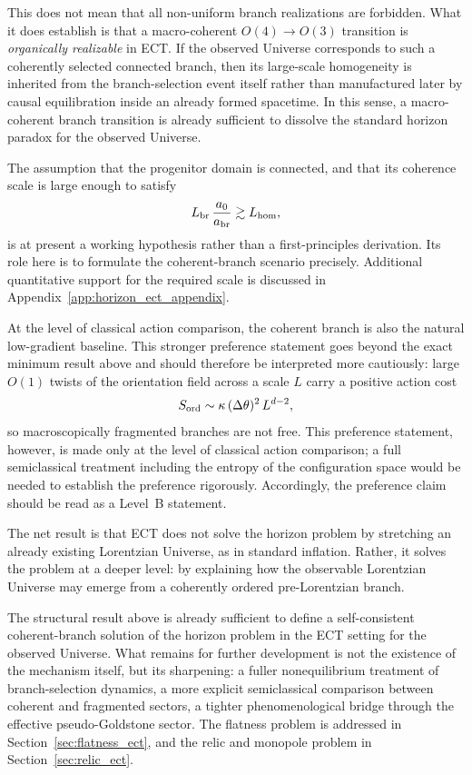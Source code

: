\documentclass[11pt,a4paper]{article}
\numberwithin{equation}{section}
\begin{document}
This does not mean that all non-uniform branch realizations are
forbidden.
What it does establish is that a macro-coherent
$O(4)\to O(3)$ transition is \emph{organically realizable} in ECT.
If the observed Universe corresponds to such a coherently selected
connected branch, then its large-scale homogeneity is inherited from the
branch-selection event itself rather than manufactured later by causal
equilibration inside an already formed spacetime.
In this sense, a macro-coherent branch transition is already sufficient
to dissolve the standard horizon paradox for the observed Universe.

The assumption that the progenitor domain is connected, and that its
coherence scale is large enough to satisfy
\[
L_{\rm br}\,\frac{a_0}{a_{\rm br}}\gtrsim L_{\rm hom},
\]
is at present a working hypothesis rather than a first-principles
derivation.
Its role here is to formulate the coherent-branch scenario precisely.
Additional quantitative support for the required scale is discussed in
Appendix~\ref{app:horizon_ect_appendix}.

At the level of classical action comparison, the coherent branch is also
the natural low-gradient baseline.
This stronger preference statement goes beyond the exact minimum result
above and should therefore be interpreted more cautiously:
large $O(1)$ twists of the orientation field across a scale $L$ carry a
positive action cost
\[
S_{\rm ord}\sim \kappa\,(\Delta\theta)^2\,L^{d-2},
\]
so macroscopically fragmented branches are not free.
This preference statement, however, is made only at the level of
classical action comparison; a full semiclassical treatment including
the entropy of the configuration space would be needed to establish the
preference rigorously.
Accordingly, the preference claim should be read as a Level~B statement.

The net result is that ECT does not solve the horizon problem by
stretching an already existing Lorentzian Universe, as in standard
inflation.
Rather, it solves the problem at a deeper level: by explaining how the
observable Lorentzian Universe may emerge from a coherently ordered
pre-Lorentzian branch.

The structural result above is already sufficient to define a
self-consistent coherent-branch solution of the horizon problem in the
ECT setting for the observed Universe.
What remains for further development is not the existence of the
mechanism itself, but its sharpening: a fuller nonequilibrium treatment
of branch-selection dynamics, a more explicit semiclassical comparison
between coherent and fragmented sectors, a tighter phenomenological
bridge through the effective pseudo-Goldstone sector.
The flatness problem is addressed in Section~\ref{sec:flatness_ect},
and the relic and monopole problem in Section~\ref{sec:relic_ect}.
\end{document}
